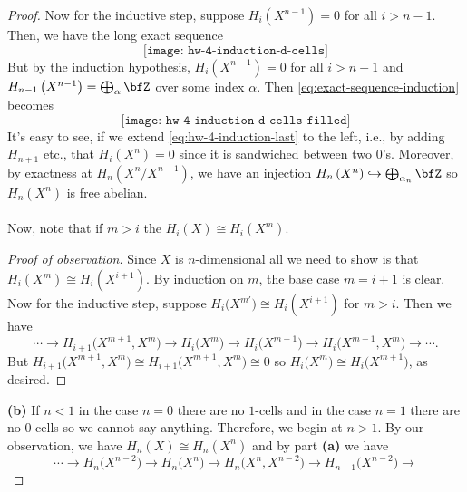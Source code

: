 \begin{proof}
Now for the inductive step, suppose $H_i(X^{n-1})=0$ for all $i>n-1$. Then,
we have the long exact sequence
\begin{equation}
\label{eq:exact-sequence-induction}
\texttt{[image: hw-4-induction-d-cells]}
\end{equation}
But by the induction hypothesis, $H_i\left(X^{n-1}\right)=0$ for
all $i>n-1$ and $H_{n-1}\left(X^{n-1}\right)=\bigoplus_\alpha\bfZ$ over
some index $\alpha$. Then \eqref{eq:exact-sequence-induction} becomes
\begin{equation}
\label{eq:hw-4-induction-last}
\texttt{[image: hw-4-induction-d-cells-filled]}
\end{equation}
It's easy to see, if we extend \eqref{eq:hw-4-induction-last} to the left,
i.e., by adding $H_{n+1}$ etc., that $H_i\left(X^n\right)=0$ since it is
sandwiched between two $0$'s. Moreover, by exactness at
$H_n\left(X^n/X^{n-1}\right)$, we have an injection
$H_n\left(X^n\right)\hookrightarrow\bigoplus_{\alpha_n}\bfZ$ so
$H_n\left(X^n\right)$ is free abelian.
\\\\
Now, note that if $m>i$ the $H_i(X)\cong H_i\left(X^m\right)$.
\begin{proof}[Proof of observation]
\renewcommand\qedsymbol{$\clubsuit$}
Since $X$ is $n$-dimensional all we need to show is that
$H_i\left(X^m\right)\cong H_i\left(X^{i+1}\right)$. By induction on $m$,
the base case $m=i+1$ is clear. Now for the inductive step, suppose
$H_i\bigl(X^{m'}\bigr)\cong H_i\left(X^{i+1}\right)$ for $m>i$. Then we
have
\begin{equation}
\label{eq:lemma-1}
\cdots\longrightarrow
H_{i+1}\bigl(X^{m+1},X^m\bigr)\longrightarrow
H_i\bigl(X^m\bigr)\longrightarrow
H_i\bigl(X^{m+1}\bigr)\longrightarrow
H_i\bigl(X^{m+1},X^m\bigr)\longrightarrow
\cdots.
\end{equation}
But $H_{i+1}\bigl(X^{m+1},X^m\bigr)\cong
H_{i+1}\bigl(X^{m+1},X^m\bigr)\cong 0$ so $H_i\bigl(X^m\bigr)\cong
H_i\bigl(X^{m+1}\bigr)$, as desired.
\end{proof}
\textbf{(b)} If $n<1$ in the case $n=0$ there are no $1$-cells and in the
case $n=1$ there are no $0$-cells so we cannot say anything. Therefore, we
begin at $n>1$. By our observation, we have $H_n(X)\cong H_n(X^n)$ and by
part \textbf{(a)} we have
\begin{equation}
  \label{eq:short-exact-cells}
\cdots\longrightarrow
H_n\bigl(X^{n-2}\bigr)\longrightarrow
H_n\bigl(X^n\bigr)\longrightarrow
H_n\bigl(X^n,X^{n-2}\bigr)\longrightarrow
H_{n-1}\bigl(X^{n-2}\bigr)\longrightarrow

\end{equation}
\end{proof}
